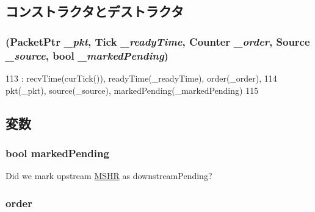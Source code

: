 \subsection{コンストラクタとデストラクタ}
\hypertarget{classMSHR_1_1Target_aabb8a1de346c61cffba6edb40bf285a6}{
\subsubsection[{Target}]{ ({\bf PacketPtr} {\em \_\-pkt}, \/  {\bf Tick} {\em \_\-readyTime}, \/  {\bf Counter} {\em \_\-order}, \/  {\bf Source} {\em \_\-source}, \/  bool {\em \_\-markedPending})}}
\label{classMSHR_1_1Target_aabb8a1de346c61cffba6edb40bf285a6}



\begin{DoxyCode}
113             : recvTime(curTick()), readyTime(_readyTime), order(_order),
114               pkt(_pkt), source(_source), markedPending(_markedPending)
115         {}
\end{DoxyCode}


\subsection{変数}
\hypertarget{classMSHR_1_1Target_a790487cb2984966102e9eceeb2dd3015}{
\subsubsection[{markedPending}]{\setlength{\rightskip}{0pt plus 5cm}bool {\bf markedPending}}}
\label{classMSHR_1_1Target_a790487cb2984966102e9eceeb2dd3015}
Did we mark upstream \hyperlink{classMSHR}{MSHR} as downstreamPending? \hypertarget{classMSHR_1_1Target_a268baba59d9078c070be7059fd90d9bc}{
\subsubsection[{order}]{ {\bf order}}}
\label{classMSHR_1_1Target_a268baba59d9078c070be7059fd90d9bc}



